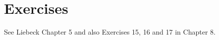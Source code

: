 \documentclass[11pt,dvipsnames]{book}
\numberwithin{figure}{section} %
\numberwithin{table}{section} %
\begin{document}
%
%
%
%
%

\section{Exercises}

See Liebeck Chapter 5 and also Exercises 15, 16 and 17 in Chapter 8.

\end{document}
